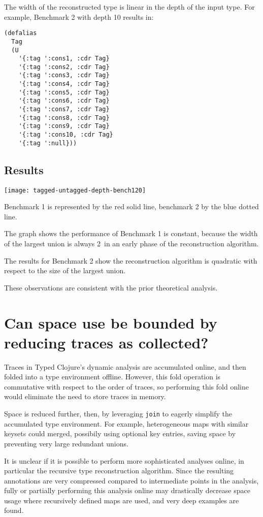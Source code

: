 The width of the reconstructed type is linear in the depth of the input type.
For example, Benchmark 2 with depth 10 results in:

\begin{verbatim}
(defalias
  Tag
  (U
    '{:tag ':cons1, :cdr Tag}
    '{:tag ':cons2, :cdr Tag}
    '{:tag ':cons3, :cdr Tag}
    '{:tag ':cons4, :cdr Tag}
    '{:tag ':cons5, :cdr Tag}
    '{:tag ':cons6, :cdr Tag}
    '{:tag ':cons7, :cdr Tag}
    '{:tag ':cons8, :cdr Tag}
    '{:tag ':cons9, :cdr Tag}
    '{:tag ':cons10, :cdr Tag}
    '{:tag ':null}))
\end{verbatim}

\subsection{Results}

\texttt{[image: tagged-untagged-depth-bench120]}

Benchmark 1 is represented by the red solid line, benchmark 2 by the
blue dotted line.

The graph shows the performance of Benchmark 1 is constant, because
the width of the largest union is always 2\ in an early phase of the reconstruction
algorithm.

The results for Benchmark 2 show the reconstruction algorithm is quadratic
with respect to the size of the largest union.

These observations are consistent with the prior theoretical analysis.

\section{Can space use be bounded by reducing traces as collected?}

Traces in Typed Clojure's dynamic analysis are accumulated online, and then
folded into a type environment offline. However, this fold operation is commutative
with respect to the order of traces, so performing this fold online would
eliminate the need to store traces in memory.

Space is reduced further, then, by leveraging \texttt{join} to eagerly simplify
the accumulated type environment. For example, heterogeneous maps with similar
keysets could merged, possibily using optional key entries, saving space by
preventing very large redundant unions.

It is unclear if it is possible to perform more sophisticated analyses online,
in particular the recursive type reconstruction algorithm. Since the resulting
annotations are very compressed compared to intermediate points in the analysis,
fully or partially performing this analysis online may drastically decrease space
usage where recursively defined maps are used, and very deep examples are found.

